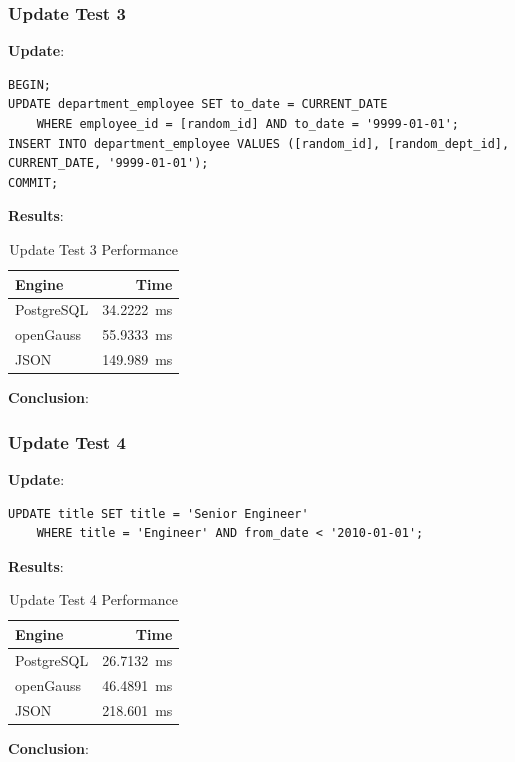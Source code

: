 \documentclass[14pt,a4paper]{article}
\begin{document}
    \subsubsection{Update Test 3}
    \textbf{Update}:
    \begin{verbatim}
BEGIN;
UPDATE department_employee SET to_date = CURRENT_DATE 
    WHERE employee_id = [random_id] AND to_date = '9999-01-01';
INSERT INTO department_employee VALUES ([random_id], [random_dept_id], CURRENT_DATE, '9999-01-01');
COMMIT;
    \end{verbatim}
    \textbf{Results}:
    \begin{table}[H]
        \centering        
        \begin{tabular}{lr}
            \toprule
            \textbf{Engine} & \textbf{Time}\\
            \midrule
            PostgreSQL & \qty{34.2222}{\milli\second}\\
            openGauss & \qty{55.9333}{\milli\second}\\
            JSON & \qty{149.989}{\milli\second}\\
            \bottomrule
        \end{tabular}
        \caption{Update Test 3 Performance}
    \end{table}
    \textbf{Conclusion}:
    
    \subsubsection{Update Test 4}
    \textbf{Update}:
    \begin{verbatim}
UPDATE title SET title = 'Senior Engineer' 
    WHERE title = 'Engineer' AND from_date < '2010-01-01';
    \end{verbatim}
    \textbf{Results}:
    \begin{table}[H]
        \centering        
        \begin{tabular}{lr}
            \toprule
            \textbf{Engine} & \textbf{Time} \\
            \midrule
            PostgreSQL & \qty{26.7132}{\milli\second}\\
            openGauss & \qty{46.4891}{\milli\second}\\
            JSON & \qty{218.601}{\milli\second}\\
            \bottomrule
        \end{tabular}
        \caption{Update Test 4 Performance}
    \end{table}
    \textbf{Conclusion}:
    
\end{document}
